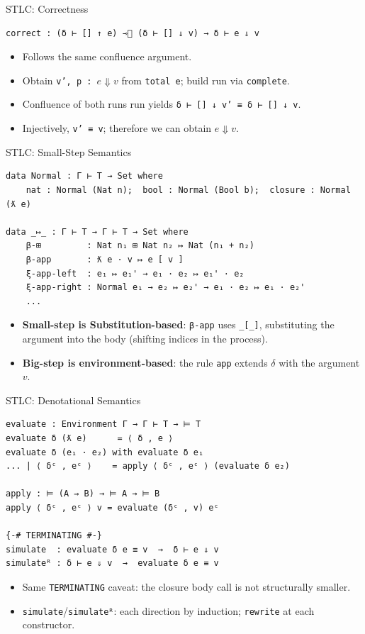 \documentclass[10pt,compress,aspectratio=169]{beamer}
\begin{document}
\begin{frame}[fragile]{STLC: Correctness}
\begin{verbatim}
correct : (δ ⊢ [] ↑ e) ⇾⃰ (δ ⊢ [] ↓ v) → δ ⊢ e ⇓ v
\end{verbatim}
\begin{itemize}
    \item Follows the same confluence argument.
    \item Obtain \texttt{v', p : $e \Downarrow v$} from \texttt{total e}; build run via \texttt{complete}.
    \item Confluence of both runs run yields \texttt{δ ⊢ [] ↓ v' ≡ δ ⊢ [] ↓ v}.
    \item Injectively, \texttt{v' ≡ v}; therefore we can obtain $e \Downarrow v$.
\end{itemize}
\end{frame}

\begin{frame}[fragile]{STLC: Small-Step Semantics}
\begin{verbatim}
data Normal : Γ ⊢ T → Set where
    nat : Normal (Nat n);  bool : Normal (Bool b);  closure : Normal (ƛ e)

data _↦_ : Γ ⊢ T → Γ ⊢ T → Set where
    β-⊞         : Nat n₁ ⊞ Nat n₂ ↦ Nat (n₁ + n₂)
    β-app       : ƛ e · v ↦ e [ v ]        
    ξ-app-left  : e₁ ↦ e₁' → e₁ · e₂ ↦ e₁' · e₂
    ξ-app-right : Normal e₁ → e₂ ↦ e₂' → e₁ · e₂ ↦ e₁ · e₂'
    ...
\end{verbatim}
\begin{itemize}
    \item \textbf{Small-step is Substitution-based}: \texttt{β-app} uses \texttt{\_[\_]}, substituting the argument into the body (shifting indices in the process).
    \item \textbf{Big-step is environment-based}: the rule \texttt{app} extends $\delta$ with the argument $v$.
\end{itemize}
\end{frame}

\begin{frame}[fragile]{STLC: Denotational Semantics}
\begin{verbatim}
evaluate : Environment Γ → Γ ⊢ T → ⊨ T
evaluate δ (ƛ e)      = ⟨ δ , e ⟩
evaluate δ (e₁ · e₂) with evaluate δ e₁
... | ⟨ δᶜ , eᶜ ⟩    = apply ⟨ δᶜ , eᶜ ⟩ (evaluate δ e₂)

apply : ⊨ (A ⇒ B) → ⊨ A → ⊨ B
apply ⟨ δᶜ , eᶜ ⟩ v = evaluate (δᶜ , v) eᶜ

{-# TERMINATING #-}
simulate  : evaluate δ e ≡ v  →  δ ⊢ e ⇓ v
simulateᴿ : δ ⊢ e ⇓ v  →  evaluate δ e ≡ v
\end{verbatim}
\begin{itemize}
    \item Same \texttt{TERMINATING} caveat: the closure body call is not structurally smaller.
    \item \texttt{simulate}/\texttt{simulateᴿ}: each direction by induction; \texttt{rewrite} at each constructor.
\end{itemize}
\end{frame}
\end{document}
